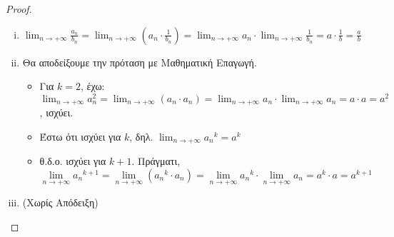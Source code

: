 \documentclass[main.tex]{subfiles}
\begin{document}
\begin{proof}
\begin{enumerate}[i)]


        \item 
            $ \lim_{n \to +\infty} \frac{a_{n}}{b_{n}} = 
            \lim_{n \to +\infty} \left(a_{n}\cdot \frac{1}{b_{n}}
            \right) = \lim_{n \to +\infty} a_{n} \cdot \lim_{n \to +\infty} 
            \frac{1}{b_{n}} = a \cdot \frac{1}{b} = \frac{a}{b}$

        \item 
            Θα αποδείξουμε την πρόταση με Μαθηματική Επαγωγή.
            \begin{itemize}
                \item Για $ k=2 $, έχω: $ \lim_{n \to +\infty} 
                    a_{n}^{2} = \lim_{n \to
                    +\infty} (a_{n} \cdot a_{n}) = 
                    \lim_{n \to +\infty} a_{n} \cdot 
                    \lim_{n \to +\infty}
                    a_{n} =  a \cdot a = a^{2}  $, ισχύει.
                \item Έστω ότι ισχύει για $k$, δηλ. $ 
                    \lim_{n \to +\infty} {a_{n}}^{k} = a^{k}  $
                \item θ.δ.ο. ισχύει για $ k+1 $. Πράγματι, 
                    \[
                        \lim_{n \to +\infty} {a_{n}}^{k+1}= 
                    \lim_{n \to +\infty} ({a_{n}}^{k} \cdot a_{n})  
                    = \lim_{n \to +\infty} {a_{n}}^{k} \cdot 
                        \lim_{n \to +\infty} a_{n} = a^{k} \cdot a = 
                        a^{k+1}
                    \] 
            \end{itemize}

        \item (Χωρίς Απόδειξη)
    \end{enumerate}
\end{proof}
\end{document}
